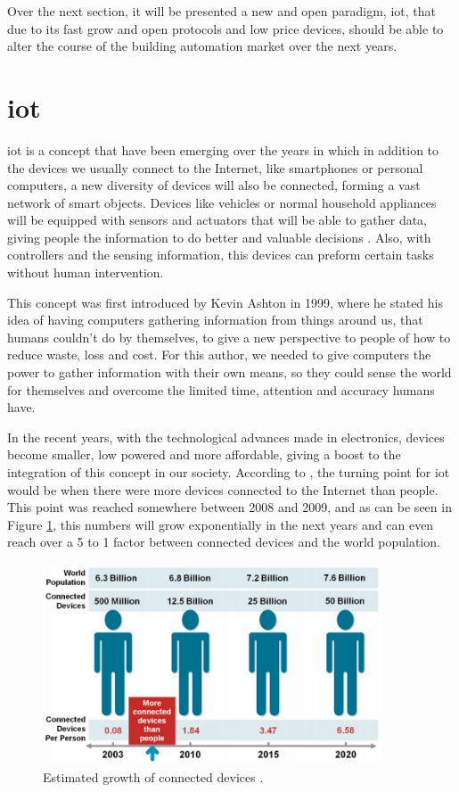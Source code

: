 Over the next section, it will be presented a new and open paradigm, \acf{iot}, that due to its fast grow and open protocols and low price devices, should be able to alter the course of the building automation market over the next years.

\section{\acf{iot}}

\acf{iot} is a concept that have been emerging over the years in which in addition to the devices we usually connect to the Internet, like smartphones or personal computers, a new diversity of devices will also be connected, forming a vast network of smart objects. Devices like vehicles or normal household appliances will be equipped with sensors and actuators that will be able to gather data, giving people the information to do better and valuable decisions \cite{Weiser1991}. Also, with controllers and the sensing information, this devices can preform certain tasks without human intervention.

This concept was first introduced by Kevin Ashton \cite{Ashton} in 1999, where he stated his idea of having computers gathering information from things around us, that humans couldn't do by themselves, to give a new perspective to people of how to reduce waste, loss and cost. For this author, we needed to give computers the power to gather information with their own means, so they could sense the world for themselves and overcome the limited time, attention and accuracy humans have.

In the recent years, with the technological advances made in electronics, devices become smaller, low powered and more affordable, giving a boost to the integration of this concept in our society. According to \cite{Evans2011}, the turning point for \ac{iot} would be when there were more devices connected to the Internet than people. This point was reached somewhere between 2008 and 2009, and as can be seen in Figure \ref{fig:iot_pic}, this numbers will grow exponentially in the next years and can even reach over a 5 to 1 factor between connected devices and the world population.

\begin{figure}[H]
	\centering
	\includegraphics[width=0.9\textwidth]{figures/iot_pic.png}
	\caption{Estimated growth of connected devices \cite{Evans2011}. }
	\label{fig:iot_pic}
\end{figure}


